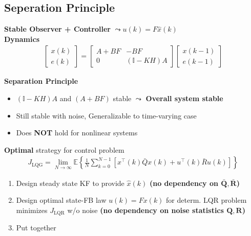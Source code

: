 \subsection{Seperation Principle}
\textbf{Stable Observer + Controller} $\leadsto u(k) = F \widehat{x}(k)$ \\
\textbf{Dynamics}
\begin{align*}
    \begin{bmatrix}
        x(k) \\
        e(k)
    \end{bmatrix}
    =
    \begin{bmatrix}
        A+BF & -BF \\
        0 & (\mathbb{I}-KH)A
    \end{bmatrix}
    \begin{bmatrix}
        x(k-1) \\
        e(k-1)
    \end{bmatrix}
\end{align*}

\textbf{Separation Principle}

\begin{itemize}[leftmargin=1em]
    \item $(\mathbb{I}-KH)A$ and $(A+BF)$ stable $\leadsto$ \textbf{Overall system stable}
    \item Still stable with noise, Generalizable to time-varying case 
    \item Does \textbf{NOT} hold for nonlinear systems
\end{itemize}

\textbf{Optimal} strategy for control problem 
\begin{align*}
    J_{\mathrm{LQG}} = \lim_{N\to\infty} \mathbb{E}\left\{ \textstyle\frac{1}{N} \sum_{k=0}^{N-1}\left[ x^\top(k)\bar{Q}x(k) + u^\top(k)\bar{R}u(k)\right] \right\}
\end{align*}
\begin{enumerate}[leftmargin=1.5em]
    \item Design steady state KF to provide $\widehat{x}(k)$
    \textbf{(no dependency on $\boldsymbol{\bar{Q}, \bar{R}}$)}
    \item Design optimal state-FB law $u(k) = Fx(k)$ for determ. LQR problem \\
    minimizes $J_{\mathrm{LQR}}$ w/o noise \textbf{(no dependency on noise statistics $\boldsymbol{Q,R}$)}
    \item Put together
\end{enumerate}

